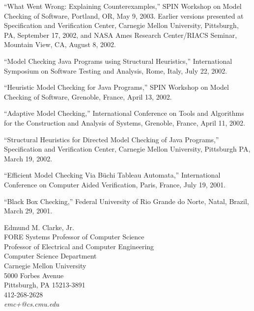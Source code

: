 \documentclass[ComputerScience]{vita}
\begin{document}
\begin{vita}
\begin{Selected Presentations}
  \item ``What Went Wrong: Explaining Counterexamples,''  SPIN Workshop on Model Checking of Software, Portland, OR, May 9, 2003.  Earlier versions presented at Specification and Verification Center, Carnegie Mellon University, Pittsburgh, PA, September 17, 2002, and NASA Ames Research Center/RIACS Seminar, Mountain View, CA, August 8, 2002.



  \item ``Model Checking Java Programs using Structural Heuristics,''  International Symposium on Software Testing and Analysis, Rome, Italy, July 22, 2002.

  \item ``Heuristic Model Checking for Java Programs,''  SPIN Workshop on Model Checking of Software, Grenoble, France, April 13, 2002.

  \item ``Adaptive Model Checking,''  International Conference on Tools and Algorithms for the Construction and Analysis of Systems, Grenoble, France, April 11, 2002.

  \item ``Structural Heuristics for Directed Model Checking of Java Programs,''  Specification and Verification Center, Carnegie Mellon University, Pittsburgh PA,  March 19, 2002.

  \item ``Efficient Model Checking Via B\"uchi Tableau Automata,''  International Conference on Computer Aided Verification, Paris, France, July 19, 2001.     

  \item ``Black Box Checking,''  Federal University of Rio Grande do Norte, Natal, Brazil, March 29, 2001.

\end{Selected Presentations}

\newpage

\begin{References}
Edmund M. Clarke, Jr. \\
FORE Systems Professor of Computer Science \\
Professor of Electrical and Computer Engineering\\
Computer Science Department \\
Carnegie Mellon University \\
5000 Forbes Avenue \\
Pittsburgh, PA 15213-3891 \\
412-268-2628\\
{\it emc+@cs.cmu.edu}


\end{References}
\end{vita}
\end{document}
